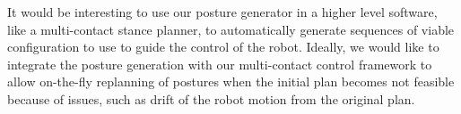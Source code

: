 It would be interesting to use our posture generator in a higher level software, like a multi-contact stance planner, to automatically generate sequences of viable configuration to use to guide the control of the robot.
Ideally, we would like to integrate the posture generation with our multi-contact control framework to allow on-the-fly replanning of postures when the initial plan becomes not feasible because of issues, such as drift of the robot motion from the original plan.




